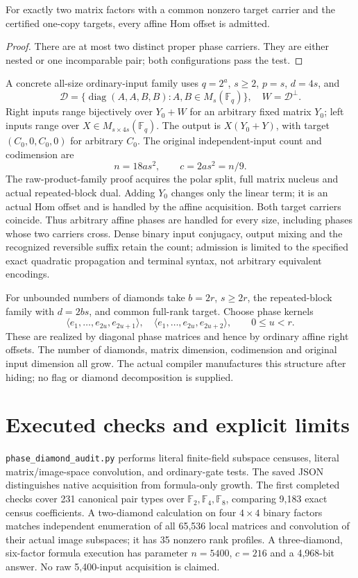 \documentclass[11pt]{article}
\newcommand{\F}{\mathbb F}\newcommand{\rank}{\operatorname{rank}}
\begin{document}
\begin{corollary}
For exactly two matrix factors with a common nonzero target carrier and
the certified one-copy targets, every affine Hom offset is admitted.
\end{corollary}
\begin{proof}
There are at most two distinct proper phase carriers. They are either
nested or one incomparable pair; both configurations pass the test.
\end{proof}

A concrete all-size ordinary-input family uses $q=2^a$, $s\ge2$, $p=s$,
$d=4s$, and
\[
 \mathcal D=\{\operatorname{diag}(A,A,B,B):A,B\in M_s(\F_q)\},
 \quad W=\mathcal D^\perp.
\]
Right inputs range bijectively over $Y_0+W$ for an arbitrary fixed matrix
$Y_0$; left inputs range over $X\in M_{s\times4s}(\F_q)$. The output is
$X(Y_0+Y)$, with target $(C_0,0,C_0,0)$ for arbitrary $C_0$.
The original independent-input count and codimension are
\[
 n=18as^2,\qquad c=2as^2=n/9.
\]
The raw-product-family proof acquires the polar split, full matrix nucleus
and actual repeated-block dual. Adding $Y_0$ changes only the linear term;
it is an actual Hom offset and is handled by the affine acquisition.
Both target carriers coincide. Thus arbitrary affine phases are handled
for every size, including phases whose two carriers cross. Dense binary
input conjugacy, output mixing and the recognized reversible suffix retain
the count; admission is limited to the specified exact quadratic
propagation and terminal syntax, not arbitrary equivalent encodings.

For unbounded numbers of diamonds take $b=2r$, $s\ge2r$, the repeated-block
family with $d=2bs$, and common full-rank target. Choose phase kernels
\[
 \langle e_1,\ldots,e_{2u},e_{2u+1}\rangle,
 \quad\langle e_1,\ldots,e_{2u},e_{2u+2}\rangle,
 \qquad0\le u<r.
\]
These are realized by diagonal phase matrices and hence by ordinary affine
right offsets. The number of diamonds, matrix dimension, codimension and
original input dimension all grow. The actual compiler manufactures this
structure after hiding; no flag or diamond decomposition is supplied.

\section{Executed checks and explicit limits}
\texttt{phase\_diamond\_audit.py} performs literal finite-field subspace
censuses, literal matrix/image-space convolution, and ordinary-gate tests.
The saved JSON distinguishes native acquisition from formula-only growth.
The first completed checks cover 231 canonical pair types over
$\F_2,\F_4,\F_8$, comparing 9,183 exact census coefficients.
A two-diamond calculation on four $4\times4$ binary factors matches
independent enumeration of all 65,536 local matrices and convolution of
their actual image subspaces; it has 35 nonzero rank profiles.
A three-diamond, six-factor formula execution has parameter $n=5400$,
$c=216$ and a 4,968-bit answer. No raw 5,400-input acquisition is claimed.
\end{document}

